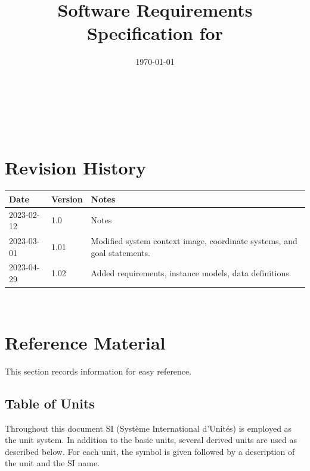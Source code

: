 \documentclass[12pt]{article}
\begin{document}
\title{Software Requirements Specification for \progname{}} 
\author{\authname}
\date{\today}
	
\maketitle

~\newpage


\tableofcontents

~\newpage

\section*{Revision History}

\begin{tabularx}{\textwidth}{p{3cm}p{2cm}X}
\toprule {\bf Date} & {\bf Version} & {\bf Notes}\\
\midrule
2023-02-12 & 1.0 & Notes\\
\midrule
2023-03-01 & 1.01 & Modified system context image, coordinate systems, and goal statements.\\
\midrule
2023-04-29 & 1.02 & Added requirements, instance models, data definitions\\
\bottomrule
\end{tabularx}

~\newpage

\section{Reference Material}

This section records information for easy reference.

\subsection{Table of Units}

Throughout this document SI (Syst\`{e}me International d'Unit\'{e}s) is employed
as the unit system.  In addition to the basic units, several derived units are
used as described below.  For each unit, the symbol is given followed by a
description of the unit and the SI name.
~\newline
\end{document}
